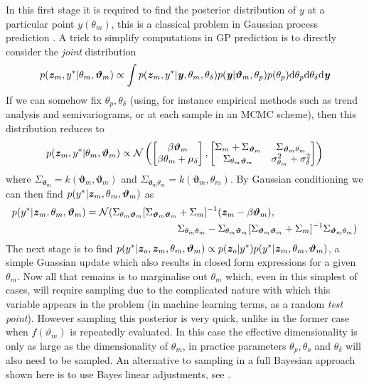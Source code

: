 \documentclass[10pt,a4paper]{article}
\newcommand{\varthetab} {{\boldsymbol{\vartheta}}}
\newcommand{\intd} {\textrm{d}}
\newcommand{\yvec} {\textbf{\textit{y}}}
\newcommand{\zvec} {\textbf{\textit{z}}}
\begin{document}
In this first stage it is required to find the posterior distribution of $y$ at a particular point $y(\theta_m)$, this is a classical problem in Gaussian process prediction \citep{Rasmussen_2006}. A trick to simplify computations in GP prediction is to directly consider the \emph{joint} distribution
\begin{equation}
p(\zvec_m,y^* | \theta_m,\varthetab_m) \propto \int p(\zvec_m,y^* | \yvec, \theta_m,\theta_\delta)p(\yvec | \varthetab_m,\theta_p)p(\theta_p) \intd \theta_p \intd \theta_\delta\intd \yvec
\end{equation}
\noindent If we can somehow fix $\theta_p,\theta_\delta$ (using, for instance empirical methods such as trend analysis and semivariograms, or at each sample in an MCMC scheme), then this distribution reduces to
\begin{equation}
p(\zvec_m,y^* | \theta_m,\varthetab_m) \propto \mathcal{N}\left(\begin{bmatrix}\beta\varthetab_m \\ \beta\theta_m + \mu_\delta \end{bmatrix},\begin{bmatrix} \Sigma_m + \Sigma_{\varthetab_m} & \Sigma_{\varthetab_m\theta_m} \\ \Sigma_{\theta_m\varthetab_m} & \sigma^2_{\theta_m} + \sigma^2_\delta \end{bmatrix}  \right)
\end{equation}
\noindent where $\Sigma_{\varthetab_m} = k(\varthetab_m,\varthetab_m)$ and $\Sigma_{\varthetab_m\theta_m} = k(\varthetab_m,\theta_m)$. By Gaussian conditioning we can then find $p(y^* | \zvec_m,\theta_m,\varthetab_m)$ as 
\begin{align}
p(y^* | \zvec_m,\theta_m,\varthetab_m) = \mathcal{N}(\Sigma_{\theta_m\varthetab_m}[\Sigma_{\varthetab_m\varthetab_m} &+ \Sigma_m]^{-1}(\zvec_m - \beta \varthetab_m) , \\
&\Sigma_{\theta_m\theta_m} - \Sigma_{\theta_m\varthetab_m}[\Sigma_{\varthetab_m\varthetab_m} + \Sigma_m]^{-1}\Sigma_{\varthetab_m\theta_m})
\end{align}
\noindent The next stage is to find $p(y^* | \zvec_o, \zvec_m, \theta_m, \varthetab_m) \propto p(\zvec_o | y^*)p(y^* | \zvec_m,\theta_m,\varthetab_m)$, a simple Guassian update which also results in closed form expressions for a given $\theta_m$. Now all that remains is to marginalise out $\theta_m$ which, even in this simplest of cases, will require sampling due to the complicated nature with which this variable appears in the problem (in machine learning terms, as a random  \emph{test point}). However sampling this posterior is very quick, unlike in the former case when $f(\vartheta_m)$ is repeatedly evaluated. In this case the effective dimensionality is only as large as the dimensionality of $\theta_m$, in practice parameters $\theta_p, \theta_o$ and $\theta_\delta$ will also need to be sampled. An alternative to sampling in a full Bayesian approach shown here is to use Bayes linear adjustments, see \cite{Craig_2001}.
\end{document}
